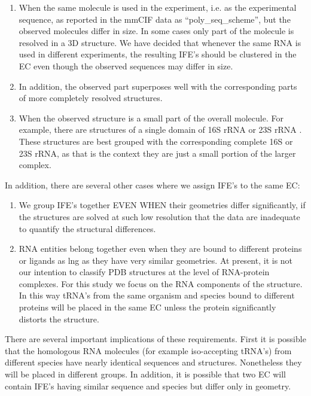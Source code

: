 \begin{enumerate}
  \item When the same molecule is used in the experiment, i.e. as the
    experimental sequence, as reported in the mmCIF data as
    ``poly\_seq\_scheme'', but the observed molecules differ in size. In some
    cases only part of the molecule is resolved in a 3D structure. We have
    decided that whenever the same RNA is used in different experiments, the
    resulting IFE's should be clustered in the EC even though the observed
    sequences may differ in size.

  \item In addition, the observed part superposes well with the corresponding parts of
    more completely resolved structures.

  \item When the observed structure is a small part of the overall molecule. For
    example, there are structures of a single domain of 16S rRNA or 23S rRNA
    \cite{Nissen2000}. These structures are best grouped with the corresponding
    complete 16S or 23S rRNA, as that is the context they are just a small
    portion of the larger complex.
\end{enumerate}

In addition, there are several other cases where we assign IFE's to the same EC:

\begin{enumerate}
  \item We group IFE's together EVEN WHEN their geometries differ significantly,
    if the structures are solved at such low resolution that the data are inadequate to
    quantify the structural differences.

  \item RNA entities belong together even when they are bound to different proteins
    or ligands as lng as they have very similar geometries. At present,
    it is not our intention to classify PDB structures at the level of
    RNA-protein complexes. For this study we focus on the RNA components of the
    structure. In this way tRNA's from the same organism and species bound to
    different proteins will be placed in the same EC unless the protein
    significantly distorts the structure.
\end{enumerate}

There are several important implications of these requirements. First it is
possible that the homologous RNA molecules (for example iso-accepting tRNA's)
from different species have nearly identical sequences and structures.
Nonetheless they will be placed in different groups. In addition, it is possible
that two EC will contain IFE's having similar sequence and species but differ
only in geometry.

